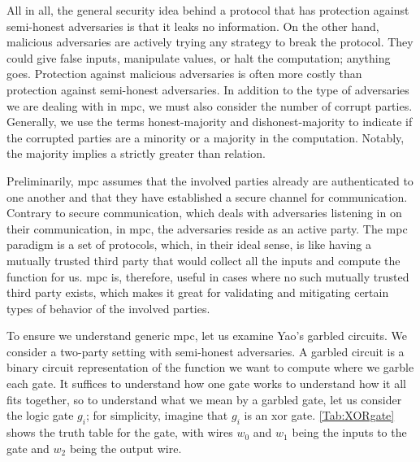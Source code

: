 All in all, the general security idea behind a protocol that has protection against semi-honest adversaries is that it leaks no information. On the other hand, malicious adversaries are actively trying any strategy to break the protocol. They could give false inputs, manipulate values, or halt the computation; anything goes. Protection against malicious adversaries is often more costly than protection against semi-honest adversaries. In addition to the type of adversaries we are dealing with in \acrshort{mpc}, we must also consider the number of corrupt parties. Generally, we use the terms honest-majority and dishonest-majority to indicate if the corrupted parties are a minority or a majority in the computation. Notably, the majority implies a strictly greater than relation.

Preliminarily, \acrshort{mpc} assumes that the involved parties already are authenticated to one another and that they have established a secure channel for communication. Contrary to secure communication, which deals with adversaries listening in on their communication, in \acrshort{mpc}, the adversaries reside as an active party. The \acrshort{mpc} paradigm is a set of protocols, which, in their ideal sense, is like having a mutually trusted third party that would collect all the inputs and compute the function for us. \acrshort{mpc} is, therefore, useful in cases where no such mutually trusted third party exists, which makes it great for validating and mitigating certain types of behavior of the involved parties.

To ensure we understand generic \acrshort{mpc}, let us examine Yao's garbled circuits. We consider a two-party setting with semi-honest adversaries. A garbled circuit is a binary circuit representation of the function we want to compute where we garble each gate. It suffices to understand how one gate works to understand how it all fits together, so to understand what we mean by a garbled gate, let us consider the logic gate $ g_i $; for simplicity, imagine that $ g_i $ is an \acrfull{xor} gate. \cref{Tab:XORgate} shows the truth table for the gate, with wires $ w_0 $ and $ w_1 $ being the inputs to the gate and $ w_2 $ being the output wire.

